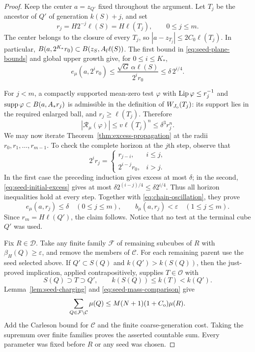 \begin{proof}
Keep the center $a=z_{Q'}$ fixed throughout the argument.  Let $T_j$
be the ancestor of $Q'$ of generation $k(S)+j$, and set
\[
 r_j=H2^{-j}\ell(S)=H\ell(T_j),\qquad 0\leq j\leq m.
\]
The center belongs to the closure of every $T_j$, so
$|a-z_{T_j}|\leq2C_0\ell(T_j)$.  In particular,
$B(a,2^{K_*}r_0)\subset B(z_S,A_{\rm f}\ell(S))$.
The first bound in \eqref{eq:seed-plane-bounds} and global upper growth
give, for $0\leq i\leq K_*$,
\begin{equation}\label{eq:seed-initial-excess}
 e_\mu(a,2^ir_0)
 \leq\frac{\sqrt G\,\alpha\ell(S)}{2^ir_0}
 \leq\delta\,2^{i/4}.
\end{equation}

For $j<m$, a compactly supported mean-zero test $\varphi$ with
$\operatorname{Lip}\varphi\leq r_j^{-1}$ and
$\operatorname{supp}\varphi\subset B(a,A_*r_j)$ is admissible in the definition of
$W_{J_{\rm o}}(T_j)$: its support lies in the required enlarged ball,
and $r_j\geq\ell(T_j)$.  Therefore
\begin{equation}\label{eq:chain-oscillation}
 |\mathcal R_\mu(\varphi)|
 \leq v\ell(T_j)^n\leq\delta^3r_j^n.
\end{equation}
We may now iterate Theorem~\ref{thm:excess-propagation} at the radii
$r_0,r_1,\ldots,r_{m-1}$.  To check the complete horizon at the $j$th
step, observe that
\[
 2^ir_j=
 \begin{cases}
 r_{j-i},&i\leq j,\\
 2^{i-j}r_0,&i>j.
 \end{cases}
\]
In the first case the preceding induction gives excess at most $\delta$;
in the second, \eqref{eq:seed-initial-excess} gives at most
$\delta2^{(i-j)/4}\leq\delta2^{i/4}$.  Thus all horizon inequalities
hold at every step.  Together with \eqref{eq:chain-oscillation}, they
prove
\[
 e_\mu(a,r_j)\leq\delta\quad(0\leq j\leq m),\qquad
 b_\mu(a,r_j)<\varepsilon\quad(1\leq j\leq m).
\]
Since $r_m=H\ell(Q')$, the claim follows.  Notice that no test at the
terminal cube $Q'$ was used.

Fix $R\in\mathcal D$.  Take any finite family $\mathcal F$ of
remaining subcubes of $R$ with $\beta_H(Q)\geq\varepsilon$, and remove
the members of $\mathcal C$.
For each remaining parent use the seed selected above.  If
$Q'\subset S(Q)$ and $k(Q')>k(S(Q))$, then the just-proved implication,
applied contrapositively, supplies $T\in\mathcal O$ with
\[
 S(Q)\supset T\supset Q',\qquad
 k(S(Q))\leq k(T)<k(Q').
\]
Lemma~\ref{lem:seed-charging} and
\eqref{eq:seed-mass-comparison} give
\[
 \sum_{Q\in\mathcal F\setminus\mathcal C}\mu(Q)
 \leq M(N+1)(1+C_{\rm o})\mu(R).
\]
Add the Carleson bound for $\mathcal C$ and the finite coarse-generation
cost.  Taking the supremum over finite families proves the asserted
countable sum.  Every parameter was fixed before $R$ or any seed was
chosen.
\end{proof}

